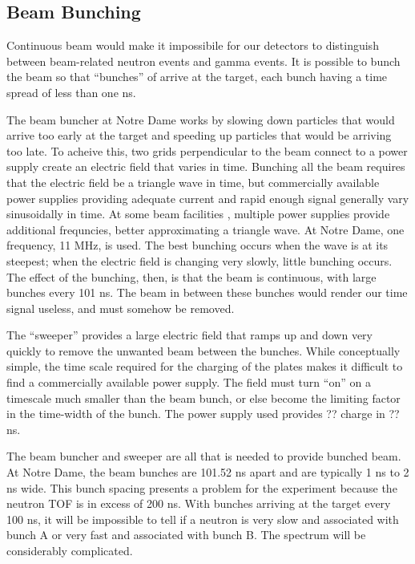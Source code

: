 \subsection{Beam Bunching}

Continuous beam would make it impossibile for our detectors to distinguish between beam-related neutron events and gamma events.  It is possible to bunch the beam so that ``bunches'' of  arrive at the target, each bunch having a time spread of less than one ns.  

The beam buncher at Notre Dame works by slowing down particles that would arrive too early at the target and speeding up particles that would be arriving too late.  To acheive this, two grids perpendicular to the beam connect to a power supply create an electric field that varies in time.  Bunching all the beam requires that the electric field be a triangle wave in time, but commercially available power supplies providing adequate current and rapid enough signal generally vary sinusoidally in time.  At some beam facilities \cite{LynchBunching}, multiple power supplies provide additional frequncies, better approximating a triangle wave.  At Notre Dame, one frequency, 11 MHz, is used.  The best bunching occurs when the wave is at its steepest; when the electric field is changing very slowly, little bunching occurs.  The effect of the bunching, then, is that the beam is continuous, with large bunches every 101 ns.  The beam in between these bunches would render our time signal useless, and must somehow be removed.

The ``sweeper'' provides a large electric field that ramps up and down very quickly to remove the unwanted beam between the bunches.  While conceptually simple, the time scale required for the charging of the plates makes it difficult to find a commercially available power supply.  The field must turn ``on'' on a timescale much smaller than the beam bunch, or else become the limiting factor in the time-width of the bunch.  The power supply used provides ?? charge in ?? ns.


The beam buncher and sweeper are all that is needed to provide bunched beam.  At Notre Dame, the beam bunches are 101.52 ns apart and are typically 1 ns to 2 ns wide.  This bunch spacing presents a problem for the experiment because the neutron TOF is in excess of 200 ns.  With bunches arriving at the target every 100 ns, it will be impossible to tell if a neutron is very slow and associated with bunch A or very fast and associated with bunch B.  The spectrum will be considerably complicated.

